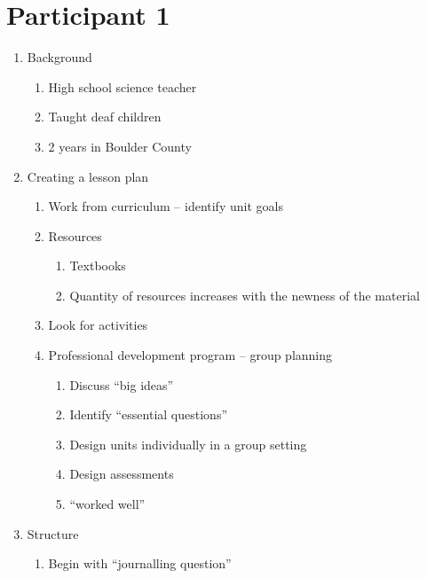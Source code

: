\documentclass[11pt,letter]{article}
\begin{document}
\section*{Participant 1}
\begin{enumerate}
	\item Background
		\begin{enumerate}
			\item High school science teacher

			\item Taught deaf children

			\item 2 years in Boulder County
		\end{enumerate}

	\item Creating a lesson plan
		\begin{enumerate}
			\item Work from curriculum -- identify unit goals

			\item Resources
				\begin{enumerate}
					\item Textbooks

					\item Quantity of resources increases with the newness of
						the material

				\end{enumerate}

			\item Look for activities

			\item Professional development program -- group planning
				\begin{enumerate}
					\item Discuss ``big ideas''

					\item Identify ``essential questions''

					\item Design units individually in a group setting

					\item Design assessments

					\item ``worked well''

				\end{enumerate}

		\end{enumerate}

	\item Structure
		\begin{enumerate}
			\item Begin with ``journalling question''


\end{enumerate}
\end{enumerate}
\end{document}
